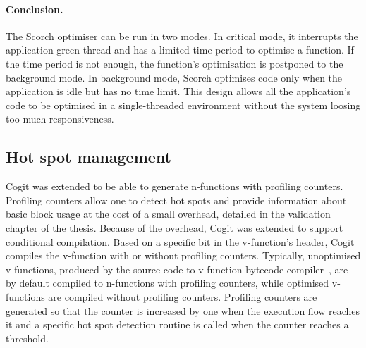 \documentclass[a4paper,12pt,twoside]{../includes/ThesisStyle}
\begin{document}

\paragraph{Conclusion.}The Scorch optimiser can be run in two modes. In critical mode, it interrupts the application green thread and has a limited time period to optimise a function. If the time period is not enough, the function's optimisation is postponed to the background mode. In background mode, Scorch optimises code only when the application is idle but has no time limit. This design allows all the application's code to be optimised in a single-threaded environment without the system loosing too much responsiveness.

\subsection{Hot spot management}
\label{sec:hotSpot}

Cogit was extended to be able to generate n-functions with profiling counters. Profiling counters allow one to detect hot spots and provide information about basic block usage at the cost of a small overhead, detailed in the validation chapter of the thesis. Because of the overhead, Cogit was extended to support conditional compilation. Based on a specific bit in the v-function's header, Cogit compiles the v-function with or without profiling counters. Typically, unoptimised v-functions, produced by the source code to v-function bytecode compiler~\cite{Bera13a}, are by default compiled to n-functions with profiling counters, while optimised v-functions are compiled without profiling counters. Profiling counters are generated so that the counter is increased by one when the execution flow reaches it and a specific hot spot detection routine is called when the counter reaches a threshold.
\end{document}
